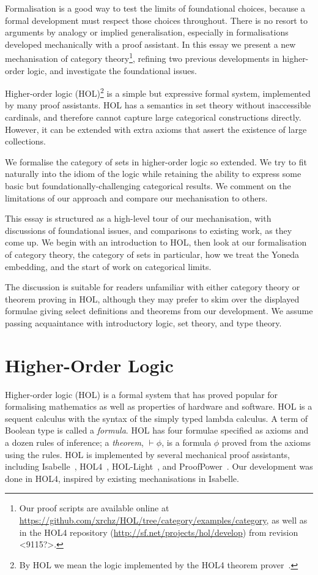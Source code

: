 \documentclass[twoside,titlepage,11pt]{article}
\begin{document}
Formalisation is a good way to test the limits of foundational choices, because a formal development must respect those choices throughout.
There is no resort to arguments by analogy or implied generalisation, especially in formalisations developed mechanically with a proof assistant.
In this essay we present a new mechanisation of category theory\footnote{Our proof scripts are available online at \url{https://github.com/xrchz/HOL/tree/category/examples/category}, as well as in the HOL4 repository (\url{http://sf.net/projects/hol/develop}) from revision <9115?>.}, refining two previous developments in higher-order logic, and investigate the foundational issues.

Higher-order logic (HOL)\footnote{By HOL we mean the logic implemented by the HOL4 theorem prover~\cite{DBLP:conf/tphol/SlindN08}.} is a simple but expressive formal system, implemented by many proof assistants.
HOL has a semantics in set theory without inaccessible cardinals, and therefore cannot capture large categorical constructions directly.
However, it can be extended with extra axioms that assert the existence of large collections.

We formalise the category of sets in higher-order logic so extended.
We try to fit naturally into the idiom of the logic while retaining the ability to express some basic but foundationally-challenging categorical results.
We comment on the limitations of our approach and compare our mechanisation to others.

This essay is structured as a high-level tour of our mechanisation, with discussions of foundational issues, and comparisons to existing work, as they come up.
We begin with an introduction to HOL, then look at our formalisation of category theory, the category of sets in particular, how we treat the Yoneda embedding, and the start of work on categorical limits.

The discussion is suitable for readers unfamiliar with either category theory or theorem proving in HOL, although they may prefer to skim over the displayed formulae giving select definitions and theorems from our development.
We assume passing acquaintance with introductory logic, set theory, and type theory.
\section{Higher-Order Logic}%
\newcommand{\bool}{\ensuremath{\mathsf{bool}}}
Higher-order logic (HOL) is a formal system that has proved popular for formalising mathematics as well as properties of hardware and software.
HOL is a sequent calculus with the syntax of the simply typed lambda calculus.
A term of Boolean type is called a \emph{formula}.
HOL has four formulae specified as axioms and a dozen rules of inference; a \emph{theorem}, $\vdash\phi$, is a formula $\phi$ proved from the axioms using the rules.
HOL is implemented by several mechanical proof assistants, including Isabelle~\cite{DBLP:conf/tphol/WenzelPN08}, HOL4~\cite{DBLP:conf/tphol/SlindN08}, HOL-Light~\cite{DBLP:conf/tphol/Harrison09a}, and ProofPower~\cite{ProofPower}.
Our development was done in HOL4, inspired by existing mechanisations \cite{Katovsky,DBLP:journals/entcs/OKeefe04} in Isabelle.
\end{document}
